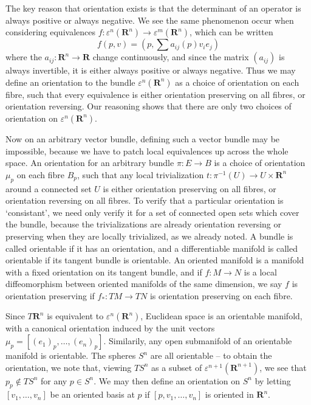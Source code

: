 The key reason that orientation exists is that the determinant of an operator is always positive or always negative. We see the same phenomenon occur when considering equivalences $f: \varepsilon^n(\mathbf{R}^n) \to \varepsilon^m(\mathbf{R}^n)$, which can be written
%
\[ f(p,v) = \left(p, \sum a_{ij}(p) v_i e_j \right) \]
%
where the $a_{ij}: \mathbf{R}^n \to \mathbf{R}$ change continuously, and since the matrix $(a_{ij})$ is always invertible, it is either always positive or always negative. Thus we may define an orientation to the bundle $\varepsilon^n(\mathbf{R}^n)$ as a choice of orientation on each fibre, such that every equivalence is either orientation preserving on all fibres, or orientation reversing. Our reasoning shows that there are only two choices of orientation on $\varepsilon^n(\mathbf{R}^n)$.

Now on an arbitrary vector bundle, defining such a vector bundle may be impossible, because we have to patch local equivalences up across the whole space. An orientation for an arbitrary bundle $\pi: E \to B$ is a choice of orientation $\mu_p$ on each fibre $B_p$, such that any local trivialization $t: \pi^{-1}(U) \to U \times \mathbf{R}^n$ around a connected set $U$ is either orientation preserving on all fibres, or orientation reversing on all fibres. To verify that a particular orientation is `consistant', we need only verify it for a set of connected open sets which cover the bundle, because the trivializations are already orientation reversing or preserving when they are locally trivialized, as we already noted. A bundle is called orientable if it has an orientation, and a differentiable manifold is called orientable if its tangent bundle is orientable. An oriented manifold is a manifold with a fixed orientation on its tangent bundle, and if $f: M \to N$ is a local diffeomorphism between oriented manifolds of the same dimension, we say $f$ is orientation preserving if $f_*: TM \to TN$ is orientation preserving on each fibre.

Since $T\mathbf{R}^n$ is equivalent to $\varepsilon^n(\mathbf{R}^n)$, Euclidean space is an orientable manifold, with a canonical orientation induced by the unit vectors $\mu_p = [(e_1)_p, \dots, (e_n)_p]$. Similarily, any open submanifold of an orientable manifold is orientable. The spheres $S^n$ are all orientable -- to obtain the orientation, we note that, viewing $TS^n$ as a subset of $\varepsilon^{n+1}(\mathbf{R}^{n+1})$, we see that $p_p \not \in TS^n$ for any $p \in S^n$. We may then define an orientation on $S^n$ by letting $[v_1, \dots, v_n]$ be an oriented basis at $p$ if $[p,v_1, \dots, v_n]$ is oriented in $\mathbf{R}^n$.


